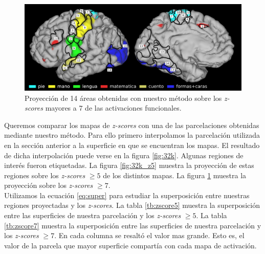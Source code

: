 \begin{figure}[h!]
    \includegraphics[width=\textwidth]{img/32k_z7.png}
    \caption{Proyecci\'on de 14 \'areas obtenidas con nuestro m\'etodo
             sobre los \textit{z-scores} mayores a $7$ de las activaciones
             funcionales.}
    \label{fig:32k_z7}
\end{figure}


Queremos comparar los mapas de \textit{z-scores} con una de las 
parcelaciones obtenidas mediante nuestro m\'etodo. Para ello primero
interpolamos la parcelaci\'on utilizada en la secci\'on anterior a la
superficie en que se encuentran los mapas. El resultado de dicha 
interpolaci\'on puede verse en la figura \ref{fig:32k}. Algunas regiones
de inter\'es fueron etiquetadas. La figura \ref{fig:32k_z5} muestra la
proyecci\'on de estas regiones sobre los \textit{z-scores} $ \geq 5$ de
los distintos mapas. La figura \ref{fig:32k_z7} muestra la proyecci\'on
sobre los \textit{z-scores} $ \geq 7$. \\

Utilizamos la ecuaci\'on \ref{eq:super} para estudiar la superposici\'on
entre nuestras regiones proyectadas y los \textit{z-scores}. La tabla 
\ref{tb:zscore5} muestra la superposici\'on entre las superficies de 
nuestra parcelaci\'on y los \textit{z-scores} $ \geq 5$.  La tabla 
\ref{tb:zscore7} muestra la superposici\'on entre las superficies de 
nuestra parcelaci\'on y los \textit{z-scores} $ \geq 7$. En cada columna
se resalt\'o el valor mas grande. Esto es, el valor de la parcela que
mayor superficie compart\'ia con cada mapa de activaci\'on.  \\
 
